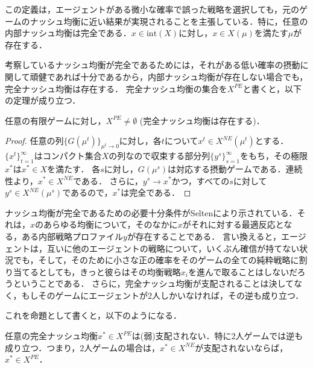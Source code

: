 \documentclass{jsreport}
\begin{document}
この定義は，エージェントがある微小な確率で誤った戦略を選択しても，元のゲームのナッシュ均衡に近い結果が実現されることを主張している．特に，任意の内部ナッシュ均衡は完全である．$x \in \mbox{int}(X)$に対し，$x \in X(\mu)$を満たす$\mu$が存在する．

考察しているナッシュ均衡が完全であるためには，それがある低い確率の摂動に関して頑健であれば十分であるから，内部ナッシュ均衡が存在しない場合でも，完全ナッシュ均衡は存在する．
完全ナッシュ均衡の集合を$X^{PE}$と書くと，以下の定理が成り立つ．

\begin{screen}
  \begin{theo}
    任意の有限ゲームに対し，$X^{PE} \neq \emptyset$ (完全ナッシュ均衡は存在する)．
  \end{theo}
\end{screen}
\begin{proof}
  任意の列$\{G(\mu^t)\}_{\mu^t \to 0}$に対し，各$t$について$x^t \in X^{NE}(\mu^t)$とする．
  $\{x^t\}_{t = 1}^{\infty}$はコンパクト集合$X$の列なので収束する部分列$\{y^s\}_{s = 1}^{\infty}$をもち，その極限$x^{*}$は$x^{*} \in X$を満たす．
  各$s$に対し，$G(\mu^s)$は対応する摂動ゲームである．連続性より，$x^{*} \in X^{NE}$である．
  さらに，$y^s \to x^{*}$かつ，すべての$s$に対して$y^s \in X^{NE}(\mu^s)$であるので，$x^{*}$は完全である．
\end{proof}

ナッシュ均衡が完全であるための必要十分条件がSeltenにより示されている．それは，$x$のあらゆる均衡について，そのなかに$x$がそれに対する最適反応となる，ある内部戦略プロファイル$y$が存在することである．
言い換えると，エージェントは，互いに他のエージェントの戦略について，いくぶん確信が持てない状況でも，そして，そのために小さな正の確率をそのゲームの全ての純粋戦略に割り当てるとしても，きっと彼らはその均衡戦略$x_i$を進んで取ることはしないだろうということである．
さらに，完全ナッシュ均衡が支配されることは決してなく，もしそのゲームにエージェントが2人しかいなければ，その逆も成り立つ．

これを命題として書くと，以下のようになる．
\begin{screen}
  \begin{prop}
    任意の完全ナッシュ均衡$x^{*} \in X^{PE}$は(弱)支配されない．特に2人ゲームでは逆も成り立つ．つまり，2人ゲームの場合は，$x^{*} \in X^{NE}$が支配されないならば，$x^{*} \in X^{PE}$．
  \end{prop}
\end{screen}
\end{document}
